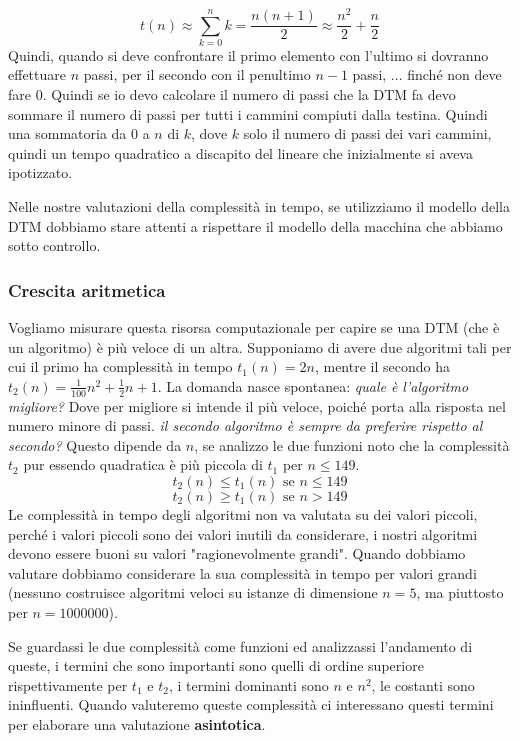 \documentclass{article}
\begin{document}
$$t(n)\approx\sum_{k=0}^{n}k=\frac{n(n+1)}{2}\approx\frac{n^2}{2}+\frac{n}{2}$$
Quindi, quando si deve confrontare il primo elemento con l'ultimo si dovranno
effettuare $n$ passi, per il secondo con il penultimo $n-1$ passi, $\dots$
finché non deve fare 0. Quindi se io devo calcolare il numero di passi che
la DTM fa devo sommare il numero di passi per tutti i cammini compiuti
dalla testina. Quindi una sommatoria da 0 a $n$ di $k$, dove $k$ solo il numero
di passi dei vari cammini, quindi un tempo quadratico a discapito del lineare
che inizialmente si aveva ipotizzato.

Nelle nostre valutazioni della complessità in tempo, se utilizziamo il modello
della DTM dobbiamo stare attenti a rispettare il modello della macchina
che abbiamo sotto controllo.

\subsubsection{Crescita aritmetica}
Vogliamo misurare questa risorsa computazionale per capire se una DTM (che è un algoritmo)
è più veloce di un altra. Supponiamo di avere due algoritmi tali per cui il primo ha
complessità in tempo $t_1(n)=2n$, mentre il secondo ha $t_2(n)=\frac{1}{100}n^2+\frac{1}{2}n+1$.
La domanda nasce spontanea: \textit{quale è l'algoritmo migliore?} Dove per migliore si intende
il più veloce, poiché porta alla risposta nel numero minore di passi.
\textit{il secondo algoritmo è sempre da preferire rispetto al secondo?} Questo dipende da $n$,
se analizzo le due funzioni noto che la complessità $t_2$ pur essendo quadratica è più
piccola di $t_1$ per $n\leq 149$.
$$t_2(n)\leq t_1(n)\text{ se }n\leq 149$$
$$t_2(n)\geq t_1(n)\text{ se }n>149$$
Le complessità in tempo degli algoritmi non va valutata su dei valori piccoli, perché i valori
piccoli sono dei valori inutili da considerare, i nostri algoritmi devono essere buoni su valori
"ragionevolmente grandi". Quando dobbiamo valutare dobbiamo considerare la sua complessità
in tempo per valori grandi (nessuno costruisce algoritmi veloci su istanze di dimensione $n=5$,
ma piuttosto per $n=1000000$).

Se guardassi le due complessità come funzioni ed analizzassi l'andamento di queste, i termini
che sono importanti sono quelli di ordine superiore rispettivamente per $t_1$ e $t_2$,
i termini dominanti sono $n$ e $n^2$, le costanti sono ininfluenti. Quando valuteremo
queste complessità ci interessano questi termini per elaborare una valutazione \textbf{asintotica}.
\end{document}
